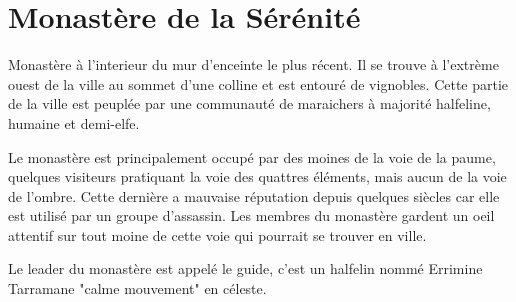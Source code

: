 \section{Monastère de la Sérénité}

Monastère à l'interieur du mur d'enceinte le plus récent. Il se trouve à 
l'extrème ouest de la ville au sommet d'une colline et est entouré de 
vignobles. Cette partie de la ville est peuplée par une communauté de
maraichers à majorité halfeline, humaine et demi-elfe.

Le monastère est principalement occupé par des moines de la voie de la
paume, quelques visiteurs pratiquant la voie des quattres éléments, mais
aucun de la voie de l'ombre. Cette dernière a mauvaise réputation depuis
quelques siècles car elle est utilisé par un groupe d'assassin. Les
membres du monastère gardent un oeil attentif sur tout moine de cette
voie qui pourrait se trouver en ville.

Le leader du monastère est appelé le guide, c'est un halfelin nommé 
Errimine Tarramane "calme mouvement" en céleste.


